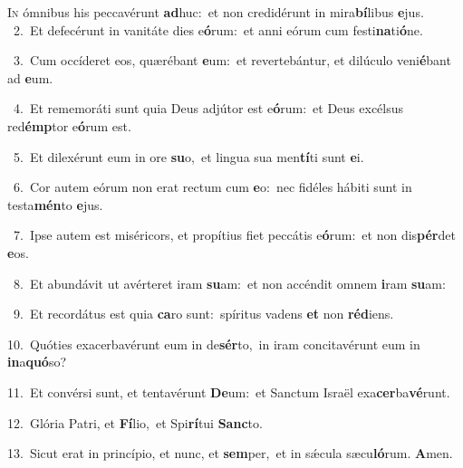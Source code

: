 \lettrine{\initial\textcolor{\initialcolor}{I}}{n} ómnibus his peccavérunt \textbf{ad}\-huc:~\star et non credidérunt in mira\-\textbf{bí}\-libus \textbf{e}\-jus.\\
{\numbfont\textcolor{\numbcolor}{~2.}}~Et defecérunt in vanitáte dies e\-\textbf{ó}\-rum:~\star et anni eórum cum festi\-\textbf{na}\-ti\-\textbf{ó}\-ne.\par
{\numbfont\textcolor{\numbcolor}{~3.}}~Cum occíderet eos, quærébant \textbf{e}\-um:~\star et revertebántur, et dilúculo veni\-\textbf{é}\-bant ad \textbf{e}\-um.\par
{\numbfont\textcolor{\numbcolor}{~4.}}~Et rememoráti sunt quia Deus adjútor est e\-\textbf{ó}\-rum:~\star et Deus excélsus red\-\textbf{émp}\-tor e\-\textbf{ó}\-rum est.\par
{\numbfont\textcolor{\numbcolor}{~5.}}~Et dilexérunt eum in ore \textbf{su}\-o,~\star et lingua sua men\-\textbf{tí}\-ti sunt \textbf{e}\-i.\par
{\numbfont\textcolor{\numbcolor}{~6.}}~Cor autem eórum non erat rectum cum \textbf{e}\-o:~\star nec fidéles hábiti sunt in testa\-\textbf{mén}\-to \textbf{e}\-jus.\par
{\numbfont\textcolor{\numbcolor}{~7.}}~Ipse autem est miséricors, et propítius fiet peccátis e\-\textbf{ó}\-rum:~\star et non dis\-\textbf{pér}\-det \textbf{e}\-os.\par
{\numbfont\textcolor{\numbcolor}{~8.}}~Et abundávit ut avérteret iram \textbf{su}\-am:~\star et non accéndit omnem \textbf{i}\-ram \textbf{su}\-am:\par
{\numbfont\textcolor{\numbcolor}{~9.}}~Et recordátus est quia \textbf{ca}\-ro sunt:~\star spíritus vadens \textbf{et} non \textbf{réd}\-iens.\par
{\numbfont\textcolor{\numbcolor}{10.}}~Quóties exacerbavérunt eum in de\-\textbf{sér}\-to,~\star in iram concitavérunt eum in \textbf{in}\-a\-\textbf{quó}\-so?\par
{\numbfont\textcolor{\numbcolor}{11.}}~Et convérsi sunt, et tentavérunt \textbf{De}\-um:~\star et Sanctum Israël exa\-\textbf{cer}\-ba\-\textbf{vé}\-runt.\par
{\numbfont\textcolor{\numbcolor}{12.}}~Glória Patri, et \textbf{Fí}\-lio,~\star et Spi\-\textbf{rí}\-tui \textbf{Sanc}\-to.\par
{\numbfont\textcolor{\numbcolor}{13.}}~Sicut erat in princípio, et nunc, et \textbf{sem}\-per,~\star et in sǽcula sæcu\-\textbf{ló}\-rum. \textbf{A}\-men.\par
